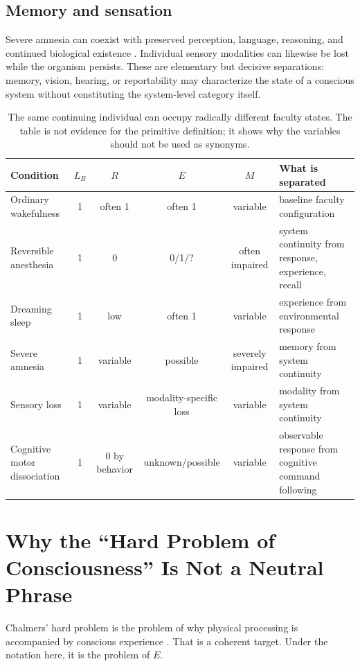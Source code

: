 \subsection{Memory and sensation}
Severe amnesia can coexist with preserved perception, language, reasoning, and continued biological existence \cite{Milner2005}. Individual sensory modalities can likewise be lost while the organism persists. These are elementary but decisive separations: memory, vision, hearing, or reportability may characterize the state of a conscious system without constituting the system-level category itself.

\begin{table}[t]
\centering
\caption{The same continuing individual can occupy radically different faculty states. The table is not evidence for the primitive definition; it shows why the variables should not be used as synonyms.}
\footnotesize
\begin{tabularx}{0.96\textwidth}{@{}l c c c c X@{}}
\toprule
Condition & $L_B$ & $R$ & $E$ & $M$ & What is separated \\
\midrule
Ordinary wakefulness & 1 & often 1 & often 1 & variable & baseline faculty configuration \\
Reversible anesthesia & 1 & 0 & 0/1/? & often impaired & system continuity from response, experience, recall \\
Dreaming sleep & 1 & low & often 1 & variable & experience from environmental response \\
Severe amnesia & 1 & variable & possible & severely impaired & memory from system continuity \\
Sensory loss & 1 & variable & modality-specific loss & variable & modality from system continuity \\
Cognitive motor dissociation & 1 & 0 by behavior & unknown/possible & variable & observable response from cognitive command following \\
\bottomrule
\end{tabularx}
\end{table}

\section{Why the ``Hard Problem of Consciousness'' Is Not a Neutral Phrase}
Chalmers' hard problem is the problem of why physical processing is accompanied by conscious experience \cite{Chalmers1995}. That is a coherent target. Under the notation here, it is the problem of $E$.

